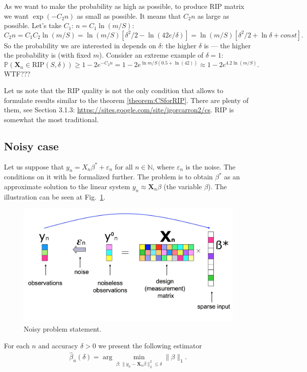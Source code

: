 \documentclass[11pt]{article}
\numberwithin{equation}{section}
\theoremstyle{definition}
\begin{document}
As we want to make the probability as high as possible, to produce RIP matrix we want $\exp(-C_2n)$ as small as possible.
It means that $C_2 n$ as large as possible.
Let's take $C_1$: $n = C_1 \ln(m / S)$:
$$C_2 n = C_1 C_2 \ln(m / S) = \ln(m / S) [ \delta^2 / 2 - \ln(42 e / \delta) ] = \ln(m/S) [ \delta^2 / 2 + \ln \delta + const ]. $$
So the probability we are interested in depends on $\delta$: the higher $\delta$ is --- the higher the probability is (with fixed $m$).
Consider an extreme example of $\delta = 1$:
$$ \mathbb P(\mathbf X_n \in \textrm{RIP}(S, \delta)) \geq 1 - 2 e^{-C_2 n} = 1 - 2 e^{ \ln{m/S}(0.5 + \ln(42))} \approx 1 - 2 e^{4.2 \ln(m/S)}. $$
WTF???

Let us note that the RIP quality is not the only condition that allows to formulate results similar to the theorem \ref{theorem:CSforRIP}.
There are plenty of them, see Section 3.1.3: \url{https://sites.google.com/site/igorcarron2/cs}.
RIP is somewhat the most traditional.

\subsection{Noisy case}
Let us suppose that $y_n = X_n \beta^* + \varepsilon_n$ for all $n \in \mathbb N$, where $\varepsilon_n$ is the noise.
The conditions on it with be formalized further.
The problem is to obtain $\beta^*$ as an approximate solution to the linear system $y_n \approx \mathbf X_n \beta$ (the variable $\beta$).
The illustration can be seen at Fig.~\ref{fig:NoisyProblemStatement}.
\begin{figure}[H]
    \begin{center}
        \includegraphics[width=.75\textwidth]{figures/problem_statement_3_noisy.pdf}
    \end{center}
    \caption{
        \label{fig:NoisyProblemStatement}
        Noisy problem statement.
    }
\end{figure}

For each $n$ and accuracy $\delta > 0$ we present the following estimator
\begin{gather*}
    \hat \beta_n(\delta) = \arg \min_{\beta: \|y_n - \mathbf X_n \beta\|_2^2 \leqslant \delta} \|\beta\|_1.
\end{gather*}
\end{document}
